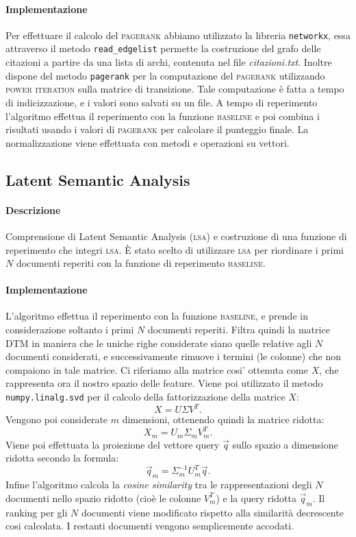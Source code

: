 \paragraph{\textbf{Implementazione}}
Per effettuare il calcolo del \textsc{pagerank} abbiamo utilizzato la libreria \texttt{networkx}, essa attraverso il metodo \texttt{read\_edgelist} permette la costruzione del grafo delle citazioni a partire da una lista di archi, contenuta nel file \textit{citazioni.txt}. Inoltre dispone del metodo \texttt{pagerank} per la computazione del \textsc{pagerank} utilizzando \textsc{power iteration} sulla matrice di transizione. Tale computazione \`e fatta a tempo di indicizzazione, e i valori sono salvati su un file. A tempo di reperimento l'algoritmo effettua il reperimento con la funzione \textsc{baseline} e poi combina i risultati usando i valori di \textsc{pagerank} per calcolare il punteggio finale. La normalizzazione viene effettuata con metodi e operazioni su vettori.

\subsection{Latent Semantic Analysis}
\label{sec:lsa}

\paragraph{\textbf{Descrizione}}
Comprensione di Latent Semantic Analysis (\textsc{lsa}) e costruzione di una funzione di reperimento che integri \textsc{lsa}. \`E stato scelto di utilizzare \textsc{lsa} per riordinare i primi $N$ documenti reperiti con la funzione di reperimento \textsc{baseline}. 

\paragraph{\textbf{Implementazione}} 
L'algoritmo effettua il reperimento con la funzione \textsc{baseline}, e prende in considerazione soltanto i primi $N$ documenti reperiti. Filtra quindi la matrice DTM in maniera che le uniche righe considerate siano quelle relative agli $N$ documenti considerati, e successivamente rimuove i termini (le colonne) che non compaiono in tale matrice. Ci riferiamo alla matrice cosi' ottenuta come $X$, che rappresenta ora il nostro spazio delle feature. Viene poi utilizzato il metodo \texttt{numpy.linalg.svd} per il calcolo della fattorizzazione della matrice $X$: 
\[ X = U \Sigma V^{T}. \]
Vengono poi considerate $m$ dimensioni, ottenendo quindi la matrice ridotta: 
\[ X_m = U_m \Sigma_m V^{T}_m. \]
Viene poi effettuata la proiezione del vettore query $\vec{q}$ sullo spazio a dimensione ridotta secondo la formula: 
\[ \vec{q}_m = \Sigma^{-1}_m U^{T}_m \vec{q}. \]
Infine l'algoritmo calcola la \textit{cosine similarity} tra le rappresentazioni degli $N$ documenti nello spazio ridotto (cio\`e le colonne $V^{T}_m$) e la query ridotta $\vec{q}_m$. Il ranking per gli $N$ documenti viene modificato rispetto alla similarit\`a decrescente cosi calcolata. I restanti documenti vengono semplicemente accodati.

